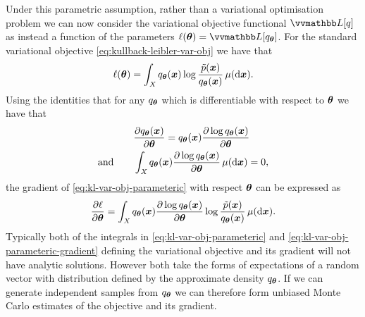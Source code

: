 
Under this parametric assumption, rather than a variational optimisation problem we can now consider the variational objective functional $\varobj[q]$ as instead a function of the parameters $\ell(\vct{\theta}) = \varobj[q_{\vct{\theta}}]$. For the standard variational objective \eqref{eq:kullback-leibler-var-obj} we have that
\begin{equation}\label{eq:kl-var-obj-parameteric}
  \ell(\boldsymbol{\theta}) = 
  \int_{\mathit{X}} q_{\boldsymbol{\theta}}(\boldsymbol{x}) \log\frac{\tilde{p}(\boldsymbol{x})}{q_{\boldsymbol{\theta}}(\boldsymbol{x})} \,\mu(\mathrm{d}\boldsymbol{x}).
\end{equation}
Using the identities that for any $q_{\boldsymbol{\theta}}$ which is differentiable with respect to $\boldsymbol{\theta}$ we have that
\begin{align}\label{eq:log-derivative-identity}
  &\frac{\partial q_{\boldsymbol{\theta}}(\boldsymbol{x})}{\partial \boldsymbol{\theta}} = 
  q_{\boldsymbol{\theta}}(\boldsymbol{x}) \frac{\partial \log q_{\boldsymbol{\theta}}(\boldsymbol{x})}{\partial \boldsymbol{\theta}}\\
  \textrm{and}\qquad &\label{eq:score-function-expectation-identity}
  \int_{\mathit{X}} q_{\boldsymbol{\theta}}(\boldsymbol{x}) \frac{\partial \log q_{\boldsymbol{\theta}}(\boldsymbol{x})}{\partial \boldsymbol{\theta}} \,\mu(\mathrm{d}\boldsymbol{x}) = 0,
\end{align} 
the gradient of \eqref{eq:kl-var-obj-parameteric} with respect $\boldsymbol{\theta}$ can be expressed as
\begin{equation}\label{eq:kl-var-obj-parameteric-gradient}
  \frac{\partial \ell}{\partial \boldsymbol{\theta}} = 
  \int_{\mathit{X}} q_{\boldsymbol{\theta}}(\boldsymbol{x}) \frac{\partial \log q_{\boldsymbol{\theta}}(\boldsymbol{x})}{\partial \boldsymbol{\theta}} \log \frac{\tilde{p}(\boldsymbol{x})}{q_{\boldsymbol{\theta}}(\boldsymbol{x})}  \,\mu(\mathrm{d}\boldsymbol{x}).
\end{equation}
Typically both of the integrals in \eqref{eq:kl-var-obj-parameteric} and \eqref{eq:kl-var-obj-parameteric-gradient} defining the variational objective and its gradient will not have analytic solutions. However both take the forms of expectations of a random vector with distribution defined by the approximate density $q_{\boldsymbol{\theta}}$. If we can generate independent samples from $q_{\boldsymbol{\theta}}$ we can therefore form unbiased Monte Carlo estimates of the objective and its gradient.

